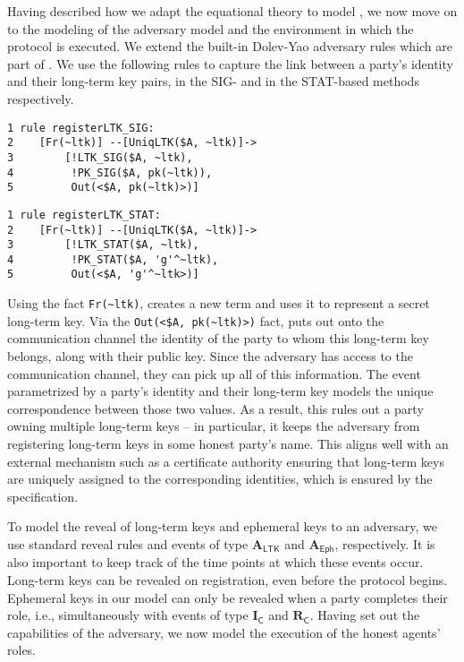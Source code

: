 \documentclass[runningheads]{llncs}
\newcommand{\mFunStyle}[1]{\textsf{#1}}
\newcommand{\mConstStyle}[1]{\textsf{#1}}
\newcommand{\mMethodStyle}[1]{\mConstStyle{#1}}
\newcommand{\mProtocolStyle}[1]{\text{#1}}
\newcommand{\mSpec}{specification}  %
\newcommand{\mRevLTK}{\ensuremath{\mathbf{A}_\mFunStyle{LTK}}}
\newcommand{\mRevEph}{\ensuremath{\mathbf{A}_\mFunStyle{Eph}}}
\newcommand{\mIComplete}{\ensuremath{\mathbf{I}_\mFunStyle{C}}}
\newcommand{\mRComplete}{\ensuremath{\mathbf{R}_\mFunStyle{C}}}
\newcommand{\mTamarin}{\mProtocolStyle{Tamarin}}
\newcommand{\mEdhoc}{\mProtocolStyle{EDHOC}}
\newcommand{\mStat}{\mMethodStyle{STAT}}
\newcommand{\mSig}{\mMethodStyle{SIG}}
\newcommand{\mT}[1]{\text{\texttt{#1}}}
\begin{document}
Having described how we adapt the equational theory to model \mEdhoc,
we now move on to the modeling of the adversary model and the 
environment in
which the protocol is executed.
%
We extend the built-in Dolev-Yao adversary rules which are part of 
\mTamarin.
%
We use the following rules to capture the link between a party's identity and
their long-term key pairs, in the \mSig{}- and in the \mStat{}-based methods
respectively.
\begin{center}
\begin{minipage}{0.48\textwidth}
\begin{scriptsize}
\begin{verbatim}
1 rule registerLTK_SIG:
2    [Fr(~ltk)] --[UniqLTK($A, ~ltk)]->
3        [!LTK_SIG($A, ~ltk),
4         !PK_SIG($A, pk(~ltk)),
5         Out(<$A, pk(~ltk)>)]
\end{verbatim}
\end{scriptsize}
\end{minipage}
\hfill\vline\hfill
\begin{minipage}{0.48\textwidth}
\begin{scriptsize}
\begin{verbatim}
1 rule registerLTK_STAT:
2    [Fr(~ltk)] --[UniqLTK($A, ~ltk)]->
3        [!LTK_STAT($A, ~ltk),
4         !PK_STAT($A, 'g'^~ltk),
5         Out(<$A, 'g'^~ltk>)]
\end{verbatim}
\end{scriptsize}
\end{minipage}
\end{center}

Using the fact \verb|Fr(~ltk)|, \mTamarin{} creates a new term \mT{ltk} and uses
it to represent a secret long-term key.
%
Via the \verb|Out(<$A, pk(~ltk)>)| fact, \mTamarin{} puts out onto the
communication channel the identity of the party to whom this long-term
key belongs, along with their public key.
%
Since the adversary has access to the communication channel, they can pick up
all of this information.
%
The event \mT{UniqLTK} parametrized by a party's identity and their
long-term key
models the unique correspondence between those two values.
%
As a result, this rules out a party owning multiple long-term keys
-- in particular, it keeps the adversary from registering long-term keys in
some honest party's name.
%
This aligns well with an external mechanism such as a certificate authority
ensuring that long-term keys are uniquely assigned to the corresponding
identities, which is ensured by the \mSpec.

To model the reveal of long-term keys and ephemeral keys to an adversary,
we use standard reveal rules and events of type \mRevLTK{} and \mRevEph,
respectively.
%
It is also important to keep track of the time points at which these events
occur.
%
Long-term keys can be revealed on registration, even before the protocol begins.
%
Ephemeral keys in our model can only be revealed when a party
completes their role, i.e., simultaneously with events of type \mIComplete{}
and \mRComplete.
%
Having set out the capabilities of the adversary, we now model the execution
of the honest agents' roles.
%
\end{document}
